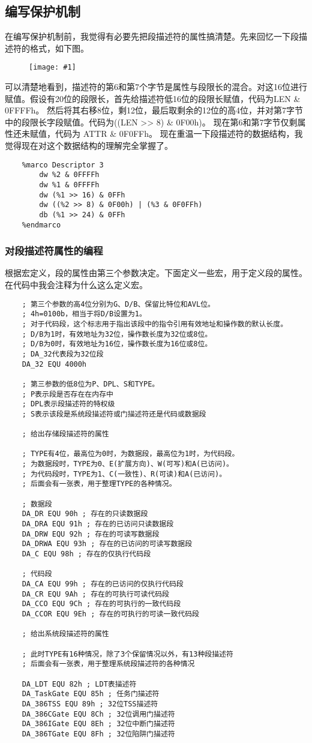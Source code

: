 \documentclass[a4paper,left=2.5cm,right=2.5cm,11pt]{article}
\newcommand{\fic}[1]{\begin{figure}[H]
		\center
		\texttt{[image: \#1]}
	\end{figure}}
\begin{document}
\subsection{编写保护机制}
	在编写保护机制前，我觉得有必要先把段描述符的属性搞清楚。先来回忆一下段描述符的格式，如下图。
	\fic{2.png}
	
	可以清楚地看到，描述符的第6和第7个字节是属性与段限长的混合。对这16位进行赋值。假设有20位的段限长，首先给描述符低16位的段限长赋值，代码为LEN \& 0FFFFh。
	然后将其右移8位，剩12位，最后取剩余的12位的高4位，并对第7字节中的段限长字段赋值。代码为((LEN >> 8) \& 0F00h)。
	现在第6和第7字节仅剩属性还未赋值，代码为 ATTR \& 0F0FFh。
	现在重温一下段描述符的数据结构，我觉得现在对这个数据结构的理解完全掌握了。
	\begin{lstlisting}
	%marco Descriptor 3
		dw %2 & 0FFFFh
		dw %1 & 0FFFFh
		dw (%1 >> 16) & 0FFh
		dw ((%2 >> 8) & 0F00h) | (%3 & 0F0FFh)
		db (%1 >> 24) & 0FFh
	%endmarco
	\end{lstlisting}

\subsubsection{对段描述符属性的编程}
	根据宏定义，段的属性由第三个参数决定。下面定义一些宏，用于定义段的属性。在代码中我会注释为什么这么定义宏。
	\begin{lstlisting}
	; 第三个参数的高4位分别为G、D/B、保留比特位和AVL位。
	; 4h=0100b，相当于将D/B设置为1。
	; 对于代码段，这个标志用于指出该段中的指令引用有效地址和操作数的默认长度。
	; D/B为1时，有效地址为32位，操作数长度为32位或8位。
	; D/B为0时，有效地址为16位，操作数长度为16位或8位。
	; DA_32代表段为32位段
	DA_32 EQU 4000h

	; 第三参数的低8位为P、DPL、S和TYPE。
	; P表示段是否存在在内存中
	; DPL表示段描述符的特权级
	; S表示该段是系统段描述符或门描述符还是代码或数据段

	; 给出存储段描述符的属性

	; TYPE有4位，最高位为0时，为数据段，最高位为1时，为代码段。
	; 为数据段时，TYPE为0、E(扩展方向)、W(可写)和A(已访问)。
	; 为代码段时，TYPE为1、C(一致性)、R(可读)和A(已访问)。
	; 后面会有一张表，用于整理TYPE的各种情况。

	; 数据段
	DA_DR EQU 90h ; 存在的只读数据段
	DA_DRA EQU 91h ; 存在的已访问只读数据段 
	DA_DRW EQU 92h ; 存在的可读写数据段
	DA_DRWA EQU 93h ; 存在的已访问的可读写数据段
	DA_C EQU 98h ; 存在的仅执行代码段

	; 代码段
	DA_CA EQU 99h ; 存在的已访问的仅执行代码段
	DA_CR EQU 9Ah ; 存在的可执行可读代码段
	DA_CCO EQU 9Ch ; 存在的可执行的一致代码段
	DA_CCOR EQU 9Eh ; 存在的可执行的可读一致代码段

	; 给出系统段描述符的属性

	; 此时TYPE有16种情况，除了3个保留情况以外，有13种段描述符
	; 后面会有一张表，用于整理系统段描述符的各种情况

	DA_LDT EQU 82h ; LDT表描述符
	DA_TaskGate EQU 85h ; 任务门描述符
	DA_386TSS EQU 89h ; 32位TSS描述符
	DA_386CGate EQU 8Ch ; 32位调用门描述符
	DA_386IGate EQU 8Eh ; 32位中断门描述符
	DA_386TGate EQU 8Fh ; 32位陷阱门描述符
	\end{lstlisting}
\end{document}
